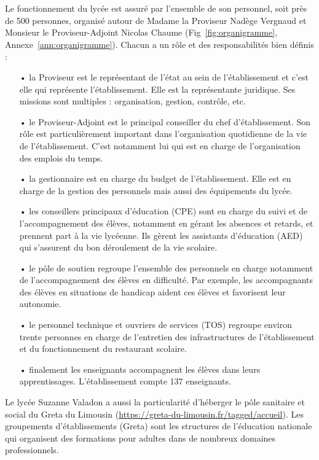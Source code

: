 \documentclass[12pt,a4paper, fleqn]{report}
\begin{document}
Le fonctionnement du lycée est assuré par l'ensemble de son personnel, soit près de 500 personnes, organisé autour de Madame la Proviseur Nadège Vergnaud et Monsieur le Proviseur-Adjoint Nicolas Chaume (Fig~\ref{fig:organigramme}, Annexe~\ref{ann:organigramme}).
Chacun a un rôle et des responsabilités bien définis \cite{Jourdan2016} :
\begin{itemize}
\item[•] la Proviseur est le représentant de l'état au sein de l'établissement et c'est elle qui représente l'établissement.
Elle est la représentante juridique.
Ses missions sont multiples : organisation, gestion, contrôle, etc.
\item[•] le Proviseur-Adjoint est le principal conseiller du chef d'établissement.
Son rôle est particulièrement important dans l'organisation quotidienne de la vie de l'établissement.
C'est notamment lui qui est en charge de l'organisation des emplois du temps.
\item[•] la gestionnaire est en charge du budget de l'établissement.
Elle est en charge de la gestion des personnels mais aussi des équipements du lycée.
\item[•] les conseillers principaux d'éducation (CPE) sont en charge du suivi et de l'accompagnement des élèves, notamment en gérant les absences et retards, et prennent part à la vie lycéenne.
Ils gèrent les assistants d'éducation (AED) qui s'assurent du bon déroulement de la vie scolaire.
\item[•] le pôle de soutien regroupe l'ensemble des personnels en charge notamment de l'accompagnement des élèves en difficulté.
Par exemple, les accompagnants des élèves en situations de handicap aident ces élèves et favorisent leur autonomie.
\item[•] le personnel technique et ouvriers de services (TOS) regroupe environ trente personnes en charge de l'entretien des infrastructures de l'établissement et du fonctionnement du restaurant scolaire.
\item[•] finalement les enseignants accompagnent les élèves dans leurs apprentissages.
L'établissement compte 137 enseignants.
\end{itemize}

Le lycée Suzanne Valadon a aussi la particularité d'héberger le pôle sanitaire et social du Greta du Limousin (\href{https://greta-du-limousin.fr/tagged/accueil}{https://greta-du-limousin.fr/tagged/accueil}).
Les groupements d'établissements (Greta) sont les structures de l'éducation nationale qui organisent des formations pour adultes dans de nombreux domaines professionnels. 
\end{document}
